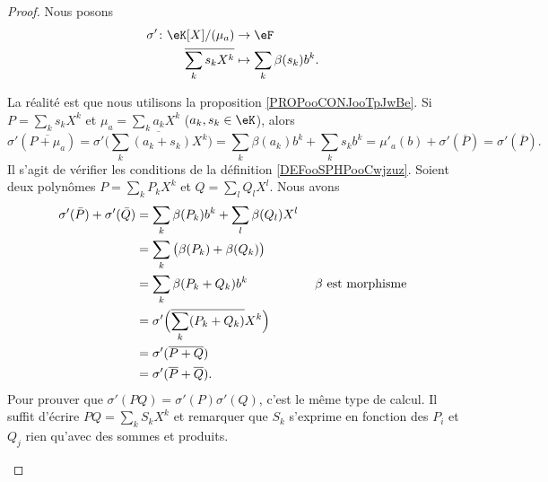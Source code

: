 \begin{proof}
	Nous posons
	\begin{equation}
		\begin{aligned}
			\sigma'\colon \eK[X]/(\mu_a) & \to \eF                      \\
			\overline{ \sum_k s_kX^k }   & \mapsto \sum_k\beta(s_k)b^k.
		\end{aligned}
	\end{equation}
	\begin{subproof}
		La réalité est que nous utilisons la proposition \ref{PROPooCONJooTpJwBe}. Si \( P=\sum_ks_kX^k\) et \( \mu_a=\sum_ka_kX^k\) (\( a_k, s_k\in \eK\)), alors
		\begin{equation}
			\sigma'(\overline{ P+\mu_a })=\sigma'\big( \overline{ \sum_k (a_k+s_k)X^k } \big)=\sum_k\beta(a_k)b^k+\sum_ks_kb^k=\mu'_a(b)+\sigma'(\overline{ P })=\sigma'(\overline{ P }).
		\end{equation}
		Il s'agit de vérifier les conditions de la définition \ref{DEFooSPHPooCwjzuz}. Soient deux polynômes \( P=\sum_kP_kX^k\) et \( Q=\sum_lQ_lX^l\).  Nous avons
		\begin{subequations}
			\begin{align}
				\sigma'(\bar P)+\sigma'(\bar Q) & =\sum_k\beta(P_k)b^k+\sum_l\beta(Q_l)X^l                                              \\
				                                & =\sum_k\big( \beta(P_k)+\beta(Q_k) \big)                                              \\
				                                & =\sum_k\beta(P_k+Q_k)b^k                          & \text{  \( \beta\) est morphisme} \\
				                                & =\sigma'\Big( \overline{\sum_k(P_k+Q_k)}X^k \Big)                                     \\
				                                & =\sigma'(\overline{P+Q})                                                              \\
				                                & =\sigma'(\overline{P}+\overline{Q}).
			\end{align}
		\end{subequations}
		Pour prouver que \( \sigma'(PQ)=\sigma'(P)\sigma'(Q)\), c'est le même type de calcul. Il suffit d'écrire \( PQ=\sum_kS_kX^k\) et remarquer que \( S_k\) s'exprime en fonction des \( P_i\) et \( Q_j\) rien qu'avec des sommes et produits.


\end{subproof}
\end{proof}
